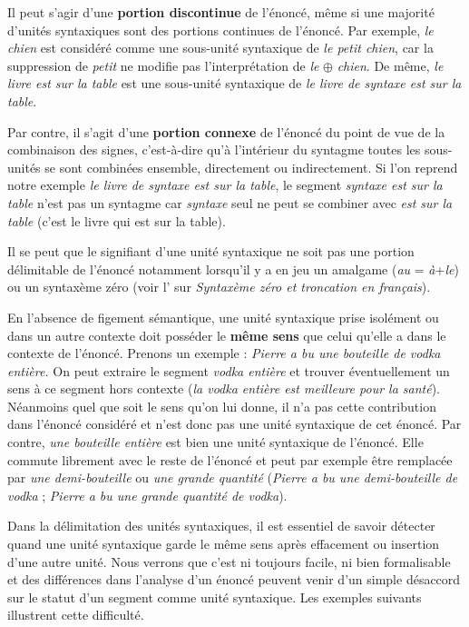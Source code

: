 Il peut s’agir d’une \textbf{portion discontinue} de l’énoncé, même si une majorité d’unités syntaxiques sont des portions continues de l’énoncé. Par exemple, \textit{le chien} est considéré comme une sous-unité syntaxique de \textit{le petit chien}, car la suppression de \textit{petit} ne modifie pas l’interprétation de \textit{le} \textbf{${\oplus}$} \textit{chien}. De même, \textit{le livre est sur la table} est une sous-unité syntaxique de \textit{le livre de syntaxe est sur la table}.

Par contre, il s’agit d’une \textbf{portion connexe} de l’énoncé du point de vue de la combinaison des signes, c’est-à-dire qu’à l’intérieur du syntagme toutes les sous-unités se sont combinées ensemble, directement ou indirectement. Si l’on reprend notre exemple \textit{le livre de syntaxe est sur la table}, le segment \textit{syntaxe est sur la table} n’est pas un syntagme car \textit{syntaxe} seul ne peut se combiner avec \textit{est sur la table} (c’est le livre qui est sur la table).

Il se peut que le signifiant d’une unité syntaxique ne soit pas une portion délimitable de l’énoncé notamment lorsqu’il y a en jeu un amalgame (\textit{au} = \textit{à}+\textit{le}) ou un syntaxème zéro (voir l’ sur \textit{Syntaxème zéro et troncation en français}).

En l’absence de figement sémantique, une unité syntaxique prise isolément ou dans un autre contexte doit posséder le \textbf{même sens} que celui qu’elle a dans le contexte de l’énoncé. Prenons un exemple : \textit{Pierre a bu une bouteille de vodka entière.} On peut extraire le segment \textit{vodka entière} et trouver éventuellement un sens à ce segment hors contexte (\textit{la vodka entière est meilleure pour la santé}). Néanmoins quel que soit le sens qu’on lui donne, il n’a pas cette contribution dans l’énoncé considéré et n’est donc pas une unité syntaxique de cet énoncé. Par contre, \textit{une bouteille entière} est bien une unité syntaxique de l’énoncé. Elle commute librement avec le reste de l’énoncé et peut par exemple être remplacée par \textit{une demi-bouteille} ou \textit{une grande quantité} (\textit{Pierre a bu une demi-bouteille de vodka} ; \textit{Pierre a bu une grande quantité de vodka}).

Dans la délimitation des unités syntaxiques, il est essentiel de savoir détecter quand une unité syntaxique garde le même sens après effacement ou insertion d’une autre unité. Nous verrons que c’est ni toujours facile, ni bien formalisable et des différences dans l’analyse d’un énoncé peuvent venir d’un simple désaccord sur le statut d’un segment comme unité syntaxique. Les exemples suivants illustrent cette difficulté.

